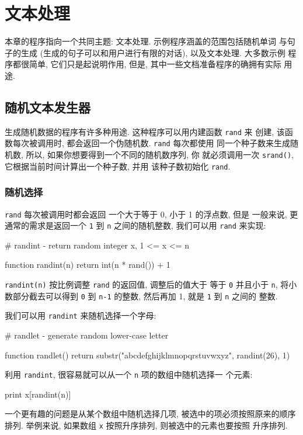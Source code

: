 \chapter{文本处理}
\label{chap:processing_words}

本章的程序指向一个共同主题: 文本处理. 示例程序涵盖的范围包括随机单词
与句子的生成 (生成的句子可以和用户进行有限的对话), 以及文本处理. 大多数示例
程序都很简单, 它们只是起说明作用, 但是, 其中一些文档准备程序的确拥有实际
用途.

\section{随机文本发生器}
\label{sec:random_text_generation}

生成随机数据的程序有许多种用途. 这种程序可以用内建函数 \texttt{rand} 来
创建, 该函数每次被调用时, 都会返回一个伪随机数. \texttt{rand} 每次都使用
同一个种子数来生成随机数, 所以, 如果你想要得到一个不同的随机数序列, 你
就必须调用一次 \texttt{srand()}, 它根据当前时间计算出一个种子数, 并用
该种子数初始化 \texttt{rand}.

\subsection{随机选择}
\label{subsec:random_choices}

\texttt{rand} 每次被调用时都会返回 一个大于等于 0, 小于 1 的浮点数, 但是
一般来说, 更通常的需求是返回一个 \texttt{1} 到 \texttt{n} 之间的随机整数,
我们可以用 \texttt{rand} 来实现:
\begin{awkcode}
    # randint - return random integer x, 1 <= x <= n

    function randint(n) {
        return int(n * rand()) + 1
    }
\end{awkcode}
\texttt{randint(n)} 按比例调整 \texttt{rand} 的返回值, 调整后的值大于
等于 \texttt{0} 并且小于 \texttt{n}, 将小数部分截去可以得到 \texttt{0} 
到 \texttt{n-1} 的整数, 然后再加 1, 就是 \texttt{1} 到 \texttt{n} 之间的 
整数.

我们可以用 \texttt{randint} 来随机选择一个字母:
\begin{awkcode}
    # randlet - generate random lower-case letter

    function randlet() {
        return substr("abcdefghijklmnopqrstuvwxyz", randint(26), 1)
    }
\end{awkcode}

利用 \texttt{randint}, 很容易就可以从一个 \texttt{n} 项的数组中随机选择一
个元素:
\begin{awkcode}
    print x[randint(n)]
\end{awkcode}
一个更有趣的问题是从某个数组中随机选择几项, 被选中的项必须按照原来的顺序
排列. 举例来说, 如果数组 \texttt{x} 按照升序排列, 则被选中的元素也要按照
升序排列.

